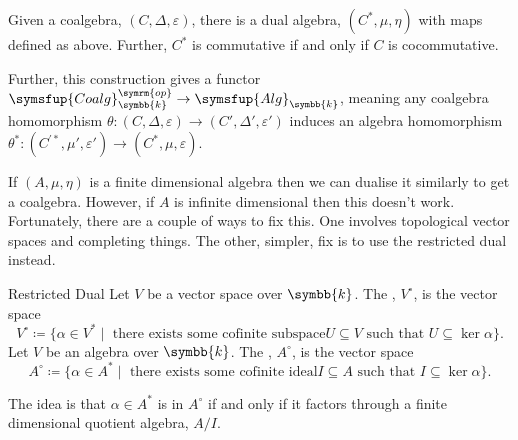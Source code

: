 \documentclass[fleqn]{NotesClass}
\makeatletter
\newcommand{\c@egory}[1]{\symsfup{#1}}
\newcommand{\Alg}[1][\field]{\c@egory{Alg}_{#1}}
\newcommand{\Coalg}[1][\field]{\c@egory{Coalg}_{#1}}
\renewcommand{\field}{\symbb{k}}
\newcommand{\op}{\symrm{op}}
\makeatother
\begin{document}
    \begin{prp}{}{}
        Given a coalgebra, \((C, \Delta, \varepsilon)\), there is a dual algebra, \((C^*, \mu, \eta)\) with maps defined as above.
        Further, \(C^*\) is commutative if and only if \(C\) is cocommutative.
        
        Further, this construction gives a functor \(\Coalg^{\op} \to \Alg\), meaning any coalgebra homomorphism \(\theta \colon (C, \Delta, \varepsilon) \to (C', \Delta', \varepsilon')\) induces an algebra homomorphism \(\theta^* \colon (C^{\prime *}, \mu', \varepsilon') \to (C^*, \mu, \varepsilon)\).
    \end{prp}
    
    If \((A, \mu, \eta)\) is a finite dimensional algebra then we can dualise it similarly to get a coalgebra.
    However, if \(A\) is infinite dimensional then this doesn't work.
    Fortunately, there are a couple of ways to fix this.
    One involves topological vector spaces and completing things.
    The other, simpler, fix is to use the restricted dual instead.
    
    \begin{dfn}{Restricted Dual}{}
        Let \(V\) be a vector space over \(\field\).
        The , \(V^{\circ}\), is the vector space
        \begin{equation}
            V^{\circ} \coloneqq \{\alpha \in V^* \mid \text{ there exists some cofinite subspace} U \subseteq V \text{ such that } U \subseteq \ker \alpha\}.
        \end{equation}
        Let \(V\) be an algebra over \(\field\).
        The , \(A^{\circ}\), is the vector space
        \begin{equation}
            A^{\circ} \coloneqq \{\alpha \in A^* \mid \text{ there exists some cofinite ideal} I \subseteq A \text{ such that } I \subseteq \ker \alpha\}.
        \end{equation}
    \end{dfn}
    
    The idea is that \(\alpha \in A^*\) is in \(A^{\circ}\) if and only if it factors through a finite dimensional quotient algebra, \(A/I\).
    
    
    \backmatter
    \renewcommand{\glossaryname}{Acronyms}
    \printglossary[acronym]
    \printindex
\end{document}
